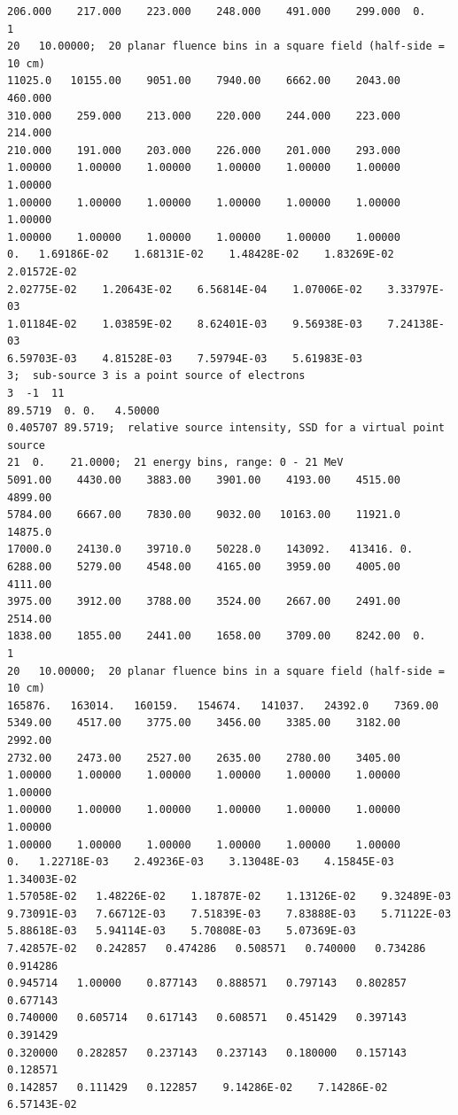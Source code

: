 \documentclass[12pt,twoside]{article}
\begin{document}
\begin{verbatim}
206.000    217.000    223.000    248.000    491.000    299.000  0.
1
20   10.00000;  20 planar fluence bins in a square field (half-side = 10 cm)
11025.0   10155.00    9051.00    7940.00    6662.00    2043.00    460.000
310.000    259.000    213.000    220.000    244.000    223.000    214.000
210.000    191.000    203.000    226.000    201.000    293.000
1.00000    1.00000    1.00000    1.00000    1.00000    1.00000    1.00000
1.00000    1.00000    1.00000    1.00000    1.00000    1.00000    1.00000
1.00000    1.00000    1.00000    1.00000    1.00000    1.00000
0.   1.69186E-02    1.68131E-02    1.48428E-02    1.83269E-02    2.01572E-02
2.02775E-02    1.20643E-02    6.56814E-04    1.07006E-02    3.33797E-03
1.01184E-02    1.03859E-02    8.62401E-03    9.56938E-03    7.24138E-03
6.59703E-03    4.81528E-03    7.59794E-03    5.61983E-03
3;  sub-source 3 is a point source of electrons
3  -1  11
89.5719  0. 0.   4.50000
0.405707 89.5719;  relative source intensity, SSD for a virtual point source
21  0.    21.0000;  21 energy bins, range: 0 - 21 MeV
5091.00    4430.00    3883.00    3901.00    4193.00    4515.00    4899.00
5784.00    6667.00    7830.00    9032.00   10163.00    11921.0    14875.0
17000.0    24130.0    39710.0    50228.0    143092.   413416. 0.
6288.00    5279.00    4548.00    4165.00    3959.00    4005.00    4111.00
3975.00    3912.00    3788.00    3524.00    2667.00    2491.00    2514.00
1838.00    1855.00    2441.00    1658.00    3709.00    8242.00  0.
1
20   10.00000;  20 planar fluence bins in a square field (half-side = 10 cm)
165876.   163014.   160159.   154674.   141037.   24392.0    7369.00
5349.00    4517.00    3775.00    3456.00    3385.00    3182.00    2992.00
2732.00    2473.00    2527.00    2635.00    2780.00    3405.00
1.00000    1.00000    1.00000    1.00000    1.00000    1.00000    1.00000
1.00000    1.00000    1.00000    1.00000    1.00000    1.00000    1.00000
1.00000    1.00000    1.00000    1.00000    1.00000    1.00000
0.   1.22718E-03    2.49236E-03    3.13048E-03    4.15845E-03    1.34003E-02
1.57058E-02   1.48226E-02    1.18787E-02    1.13126E-02    9.32489E-03
9.73091E-03   7.66712E-03    7.51839E-03    7.83888E-03    5.71122E-03
5.88618E-03   5.94114E-03    5.70808E-03    5.07369E-03
7.42857E-02   0.242857   0.474286   0.508571   0.740000   0.734286   0.914286
0.945714   1.00000    0.877143   0.888571   0.797143   0.802857   0.677143
0.740000   0.605714   0.617143   0.608571   0.451429   0.397143   0.391429
0.320000   0.282857   0.237143   0.237143   0.180000   0.157143   0.128571
0.142857   0.111429   0.122857    9.14286E-02    7.14286E-02    6.57143E-02

\end{verbatim}
\end{document}

